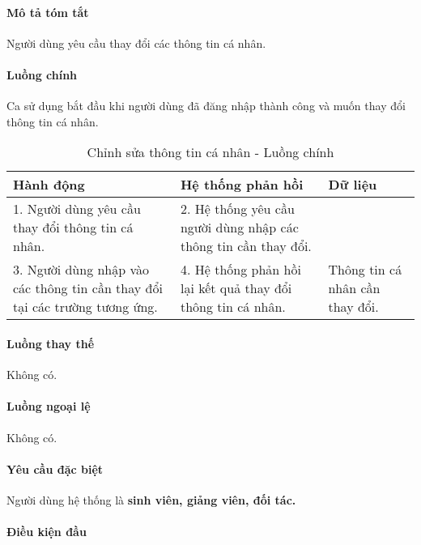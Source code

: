 \documentclass[./../main.tex]{subfiles}
\begin{document}
\paragraph*{Mô tả tóm tắt}

Người dùng yêu cầu thay đổi các thông tin cá nhân.

\paragraph*{Luồng chính} Ca sử dụng bắt đầu khi người dùng đã đăng nhập thành
công và muốn thay đổi thông tin cá nhân.

\begin{table}[H]
	\caption{Chỉnh sửa thông tin cá nhân - Luồng chính}
	\label{tab:update_info}
	\begin{tabularx}{\textwidth}{|X|X|X|}
		\hline
		\textbf{Hành động}                                                          & \textbf{Hệ thống phản hồi}                                      & \textbf{Dữ liệu}                \\ \hline
		1. Người dùng yêu cầu thay đổi thông tin cá nhân.                           & 2. Hệ thống yêu cầu người dùng nhập các thông tin cần thay đổi. &                                 \\ \hline
		3. Người dùng nhập vào các thông tin cần thay đổi tại các trường tương ứng. & 4. Hệ thống phản hồi lại kết quả thay đổi thông tin cá nhân.    & Thông tin cá nhân cần thay đổi. \\ \hline
	\end{tabularx}
\end{table}

\paragraph*{Luồng thay thế} Không có.

\paragraph*{Luồng ngoại lệ} Không có.

\paragraph*{Yêu cầu đặc biệt}

Người dùng hệ thống là \textbf{sinh viên, giảng viên, đối tác.}

\paragraph*{Điều kiện đầu}
\end{document}
